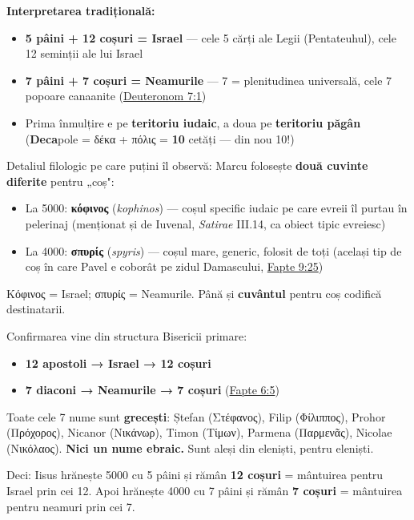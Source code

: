 \documentclass[12pt,a4paper,twoside,openany]{book}
\begin{document}
\textbf{Interpretarea tradițională:}

\begin{itemize}
  \item \textbf{5 pâini + 12 coșuri = Israel} — cele 5 cărți ale Legii (Pentateuhul), cele 12 seminții ale lui Israel
  \item \textbf{7 pâini + 7 coșuri = Neamurile} — 7 = plenitudinea universală, cele 7 popoare canaanite (\href{https://bibliaortodoxa.ro/carte.php?id=17\&cap=7\#1}{Deuteronom 7:1})
  \item Prima înmulțire e pe \textbf{teritoriu iudaic}, a doua pe \textbf{teritoriu păgân} (\textbf{Deca}pole = δέκα + πόλις = \textbf{10} cetăți — din nou 10!)
\end{itemize}
Detaliul filologic pe care puțini îl observă: Marcu folosește \textbf{două cuvinte diferite} pentru „coș":

\begin{itemize}
  \item La 5000: \textbf{κόφινος} (\textit{kophinos}) — coșul specific iudaic pe care evreii îl purtau în pelerinaj (menționat și de Iuvenal, \textit{Satirae} III.14, ca obiect tipic evreiesc)
  \item La 4000: \textbf{σπυρίς} (\textit{spyris}) — coșul mare, generic, folosit de toți (același tip de coș în care Pavel e coborât pe zidul Damascului, \href{https://bibliaortodoxa.ro/carte.php?id=26\&cap=9\#25}{Fapte 9:25})
\end{itemize}
Κόφινος = Israel; σπυρίς = Neamurile. Până și \textbf{cuvântul} pentru coș codifică destinatarii.

Confirmarea vine din structura Bisericii primare:

\begin{itemize}
  \item \textbf{12 apostoli → Israel → 12 coșuri}
  \item \textbf{7 diaconi → Neamurile → 7 coșuri} (\href{https://bibliaortodoxa.ro/carte.php?id=26\&cap=6\#5}{Fapte 6:5})
\end{itemize}
Toate cele 7 nume sunt \textbf{grecești}: Ștefan (Στέφανος), Filip (Φίλιππος), Prohor (Πρόχορος), Nicanor (Νικάνωρ), Timon (Τίμων), Parmena (Παρμενᾶς), Nicolae (Νικόλαος). \textbf{Nici un nume ebraic.} Sunt aleși din eleniști, pentru eleniști.

Deci: Iisus hrănește 5000 cu 5 pâini și rămân \textbf{12 coșuri} = mântuirea pentru Israel prin cei 12. Apoi hrănește 4000 cu 7 pâini și rămân \textbf{7 coșuri} = mântuirea pentru neamuri prin cei 7.
\end{document}
